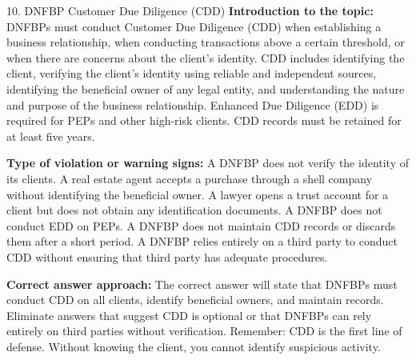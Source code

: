 \documentclass[11pt,a4paper]{beamer}
\begin{document}
\begin{frame}{10. DNFBP Customer Due Diligence (CDD)}
\tiny
\noindent\textbf{Introduction to the topic:} DNFBPs must conduct Customer Due Diligence (CDD) when establishing a business relationship, when conducting transactions above a certain threshold, or when there are concerns about the client's identity. CDD includes identifying the client, verifying the client's identity using reliable and independent sources, identifying the beneficial owner of any legal entity, and understanding the nature and purpose of the business relationship. Enhanced Due Diligence (EDD) is required for PEPs and other high-risk clients. CDD records must be retained for at least five years.

\vspace{0.1cm}
\noindent\textbf{Type of violation or warning signs:} A DNFBP does not verify the identity of its clients. A real estate agent accepts a purchase through a shell company without identifying the beneficial owner. A lawyer opens a trust account for a client but does not obtain any identification documents. A DNFBP does not conduct EDD on PEPs. A DNFBP does not maintain CDD records or discards them after a short period. A DNFBP relies entirely on a third party to conduct CDD without ensuring that third party has adequate procedures.

\vspace{0.1cm}
\noindent\textbf{Correct answer approach:} The correct answer will state that DNFBPs must conduct CDD on all clients, identify beneficial owners, and maintain records. Eliminate answers that suggest CDD is optional or that DNFBPs can rely entirely on third parties without verification. Remember: CDD is the first line of defense. Without knowing the client, you cannot identify suspicious activity.
\end{frame}
\end{document}
